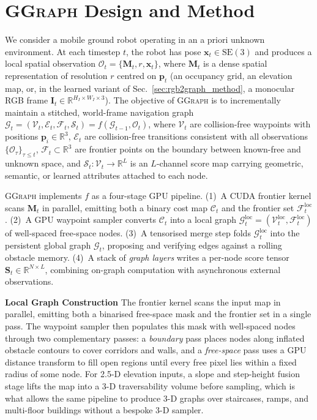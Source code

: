 \documentclass{article}
\newcommand{\sysname}{\textcolor{ggcolor}{\textsc{GGraph}}\xspace}
\begin{document}
\section{\sysname Design and Method}
\label{sec:problem}
We consider a mobile ground robot operating in an a priori unknown
environment. At each timestep $t$, the robot has pose
$\mathbf{x}_t \in \mathrm{SE}(3)$ and produces a local spatial
observation $\mathcal{O}_t = \{\mathbf{M}_t, r, \mathbf{x}_t\}$, where
$\mathbf{M}_t$ is a dense spatial representation of resolution $r$
centred on $\mathbf{p}_t$ (an occupancy grid, an elevation map, or, in
the learned variant of Sec.~\ref{sec:rgb2graph_method}, a monocular RGB
frame $\mathbf{I}_t \in \mathbb{R}^{H_I \times W_I \times 3}$). The
objective of \sysname is to incrementally maintain a stitched,
world-frame navigation graph
$\mathcal{G}_t = (\mathcal{V}_t, \mathcal{E}_t, \mathcal{F}_t, \mathcal{S}_t)
= f(\mathcal{G}_{t-1}, \mathcal{O}_t)$,
where $\mathcal{V}_t$ are collision-free waypoints with positions
$\mathbf{p}_i \in \mathbb{R}^3$, $\mathcal{E}_t$ are collision-free
transitions consistent with all observations
$\{\mathcal{O}_\tau\}_{\tau\le t}$, $\mathcal{F}_t \subset \mathbb{R}^3$
are frontier points on the boundary between known-free and unknown
space, and $\mathcal{S}_t : \mathcal{V}_t \to \mathbb{R}^L$ is an
$L$-channel score map carrying geometric, semantic, or learned
attributes attached to each node.


\sysname implements $f$ as a four-stage GPU pipeline. (1)~A CUDA
frontier kernel scans $\mathbf{M}_t$ in parallel, emitting both a binary
cost map $\mathcal{C}_t$ and the frontier set
$\mathcal{F}_t^{\text{loc}}$. (2)~A GPU waypoint sampler converts
$\mathcal{C}_t$ into a local graph
$\mathcal{G}_t^{\text{loc}}=(\mathcal{V}_t^{\text{loc}},\mathcal{F}_t^{\text{loc}})$
of well-spaced free-space nodes. (3)~A tensorised merge step folds
$\mathcal{G}_t^{\text{loc}}$ into the persistent global graph
$\mathcal{G}_t$, proposing and verifying edges against a rolling
obstacle memory. (4)~A stack of \emph{graph layers} writes a per-node
score tensor $\mathbf{S}_t \in \mathbb{R}^{N\times L}$, combining
on-graph computation with asynchronous external observations.

\textbf{Local Graph Construction}
The frontier kernel scans the input map in parallel, emitting both a
binarised free-space mask and the frontier set in a single pass. The
waypoint sampler then populates this mask with well-spaced nodes
through two complementary passes: a \emph{boundary} pass places nodes
along inflated obstacle contours to cover corridors and walls, and a
\emph{free-space} pass uses a GPU distance transform to fill open
regions until every free pixel lies within a fixed radius of some
node. For 2.5-D elevation inputs, a slope and step-height fusion
stage lifts the map into a 3-D traversability volume before sampling,
which is what allows the same pipeline to produce 3-D graphs over
staircases, ramps, and multi-floor buildings without a bespoke 3-D
sampler.
\end{document}
